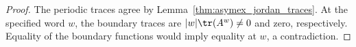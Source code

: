 \begin{proof}
    \leanok
    The periodic traces agree by
    Lemma~\ref{thm:asymex_jordan_traces}.
    At the specified word $w$, the boundary traces are
    $|w|\tr(A^w)\neq0$ and zero, respectively.
    Equality of the boundary functions would imply equality at $w$,
    a contradiction.
\end{proof}
